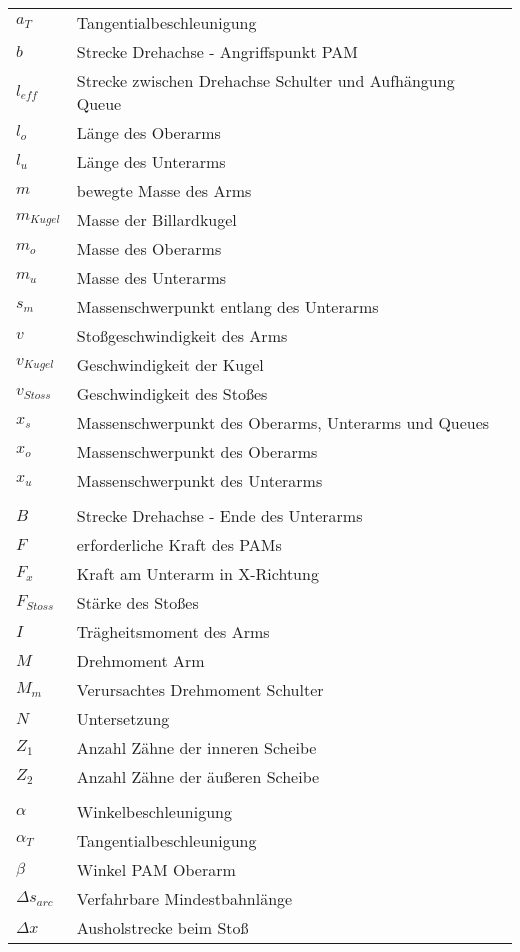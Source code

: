     \begin{table}[h]
        \begin{tabular}{@{}ll@{}}%
            \(a_T\) & Tangentialbeschleunigung\\
            \(b\) & Strecke Drehachse - Angriffspunkt PAM\\
            \(l_{eff}\) & Strecke zwischen Drehachse Schulter und Aufhängung Queue\\
            \(l_o\) & Länge des Oberarms\\
            \(l_u\) & Länge des Unterarms\\
            \(m\) & bewegte Masse des Arms\\
            \(m_{Kugel}\) & Masse der Billardkugel\\
            \(m_o\) & Masse des Oberarms\\
            \(m_u\) & Masse des Unterarms\\
            \(s_m\) & Massenschwerpunkt entlang des Unterarms\\
            \(v\) & Stoßgeschwindigkeit des Arms\\
            \(v_{Kugel}\) & Geschwindigkeit der Kugel\\
            \(v_{Stoss}\) & Geschwindigkeit des Stoßes\\
            \(x_s\) & Massenschwerpunkt des Oberarms, Unterarms und Queues\\
            \(x_o\) & Massenschwerpunkt des Oberarms\\
            \(x_u\) & Massenschwerpunkt des Unterarms\\
            & \\
            \(B\) & Strecke Drehachse - Ende des Unterarms\\
            \(F\) & erforderliche Kraft des PAMs\\
            \(F_x\) & Kraft am Unterarm in X-Richtung\\
            \(F_{Stoss}\) & Stärke des Stoßes\\
            \(I\) & Trägheitsmoment des Arms\\
            \(M\) & Drehmoment Arm\\
            \(M_m\) & Verursachtes Drehmoment Schulter\\
            \(N\) & Untersetzung\\
            \(Z_1\) & Anzahl Zähne der inneren Scheibe\\
            \(Z_2\) & Anzahl Zähne der äußeren Scheibe\\
            & \\
            \(\alpha\) & Winkelbeschleunigung\\
            \(\alpha_T\) & Tangentialbeschleunigung\\
            \(\beta\) & Winkel PAM Oberarm\\
            \(\Delta s_{arc}\) & Verfahrbare Mindestbahnlänge\\
            \(\Delta x\) & Ausholstrecke beim Stoß
    \end{tabular}\label{tab:glossar}
    \end{table}